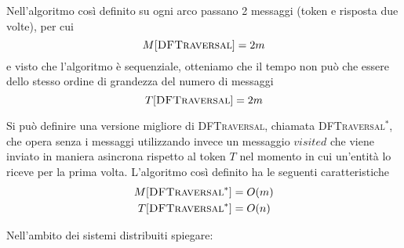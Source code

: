 \documentclass[12pt, answers]{exam}
\begin{document}
\begin{questions}
\begin{parts}
\begin{solution}
			Nell'algoritmo così definito su ogni arco passano 2 messaggi (token e risposta due volte), per cui
			$$ M[\textsc{DFTraversal}] = 2m $$
			e visto che l'algoritmo è sequenziale, otteniamo che il tempo non può che essere dello stesso ordine di grandezza del numero di messaggi
			$$ T[\textsc{DFTraversal}] = 2m $$

			Si può definire una versione migliore di \textsc{DFTraversal}, chiamata \textsc{DFTraversal}$^\ast$, che opera senza i messaggi utilizzando invece un messaggio $visited$ che viene inviato in maniera asincrona rispetto al token $T$ nel momento in cui un'entità lo riceve per la prima volta.
			L'algoritmo così definito ha le seguenti caratteristiche
			\begin{align*}
				M[\textsc{DFTraversal}^\ast] &= O(m) \\
				T[\textsc{DFTraversal}^\ast] &= O(n)
			\end{align*}
		\end{solution}
	\end{parts}
	\question Nell'ambito dei sistemi distribuiti spiegare:
\end{questions}
\end{document}
